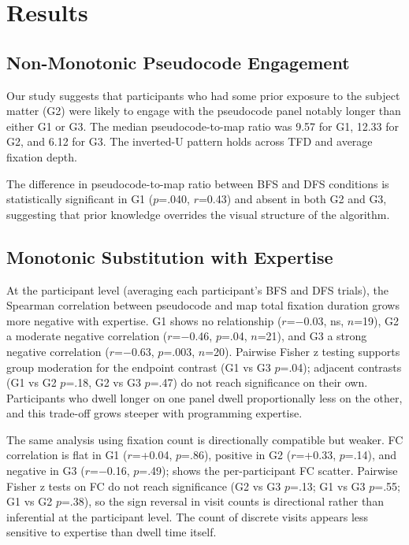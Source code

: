 \documentclass[journal]{vgtc}
\begin{document}
\section{Results}

\subsection{Non-Monotonic Pseudocode Engagement}
\label{sec:inverted}

Our study suggests that participants who had some prior exposure to the subject
matter (G2) were likely to engage with the pseudocode panel notably longer than
either G1 or G3. The median pseudocode-to-map ratio was 9.57 for G1, 12.33
for G2, and 6.12 for G3. The inverted-U pattern holds across TFD and average
fixation depth.

The difference in pseudocode-to-map ratio between BFS and DFS conditions is
statistically significant in G1 ($p$=.040, $r$=0.43) and absent in both G2
and G3, suggesting that prior knowledge overrides the visual structure of the
algorithm.

\subsection{Monotonic Substitution with Expertise}
\label{sec:reversal}

At the participant level (averaging each participant's BFS and DFS trials),
the Spearman correlation between pseudocode and map total fixation duration
grows more negative with expertise. G1 shows no relationship ($r$=$-$0.03,
ns, $n$=19), G2 a moderate negative correlation ($r$=$-$0.46, $p$=.04,
$n$=21), and G3 a strong negative correlation ($r$=$-$0.63, $p$=.003,
$n$=20). Pairwise Fisher z testing supports group moderation for the
endpoint contrast (G1 vs G3 $p$=.04); adjacent contrasts (G1 vs G2 $p$=.18,
G2 vs G3 $p$=.47) do not reach significance on their own. Participants who
dwell longer on one panel dwell proportionally less on the other, and this
trade-off grows steeper with programming expertise.

The same analysis using fixation count is directionally compatible but
weaker. FC correlation is flat in G1 ($r$=+0.04, $p$=.86), positive in G2
($r$=+0.33, $p$=.14), and negative in G3 ($r$=$-$0.16, $p$=.49);
 shows the per-participant FC scatter. Pairwise Fisher z
tests on FC do not reach significance (G2 vs G3 $p$=.13; G1 vs G3 $p$=.55;
G1 vs G2 $p$=.38), so the sign reversal in visit counts is directional
rather than inferential at the participant level. The count of discrete
visits appears less sensitive to expertise than dwell time itself.
\end{document}
